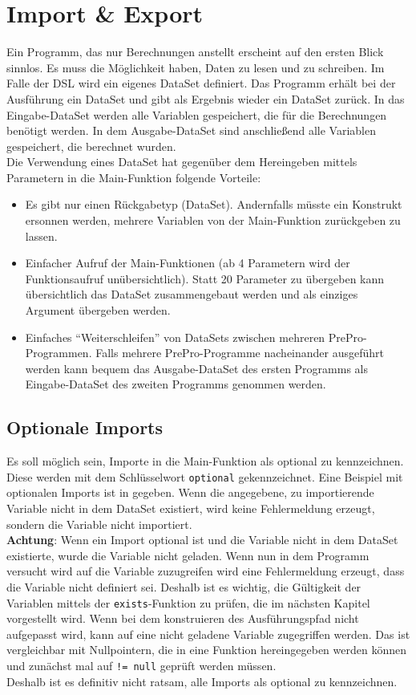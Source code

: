 \section{Import \& Export}
\label{sec:Import}

Ein Programm, das nur Berechnungen anstellt erscheint auf den ersten Blick sinnlos.
Es muss die Möglichkeit haben, Daten zu lesen und zu schreiben.
Im Falle der DSL wird ein eigenes DataSet definiert.
Das Programm erhält bei der Ausführung ein DataSet und gibt als Ergebnis wieder ein DataSet zurück.
In das Eingabe-DataSet werden alle Variablen gespeichert, die für die Berechnungen benötigt werden.
In dem Ausgabe-DataSet sind anschließend alle Variablen gespeichert, die berechnet wurden.\\
Die Verwendung eines DataSet hat gegenüber dem Hereingeben mittels Parametern in die Main-Funktion folgende Vorteile:
\begin{itemize}
\item Es gibt nur einen Rückgabetyp (DataSet).
Andernfalls müsste ein Konstrukt ersonnen werden, mehrere Variablen von der Main-Funktion zurückgeben zu lassen.
\item Einfacher Aufruf der Main-Funktionen (ab 4 Parametern wird der Funktionsaufruf unübersichtlich\cite{parameterCount}). Statt 20 Parameter zu übergeben kann übersichtlich das DataSet zusammengebaut werden und als einziges Argument übergeben werden.
\item Einfaches ``Weiterschleifen'' von DataSets zwischen mehreren PrePro-Programmen.
Falls mehrere PrePro-Programme nacheinander ausgeführt werden kann bequem das Ausgabe-DataSet des ersten Programms als Eingabe-DataSet des zweiten Programms genommen werden.
\end{itemize}

\subsection{Optionale Imports}
Es soll möglich sein, Importe in die Main-Funktion als optional zu kennzeichnen.
Diese werden mit dem Schlüsselwort \texttt{optional} gekennzeichnet.
Eine Beispiel mit optionalen Imports ist in  gegeben.
Wenn die angegebene, zu importierende Variable nicht in dem DataSet existiert, wird keine Fehlermeldung erzeugt, sondern die Variable nicht importiert.\\
\textbf{Achtung}: Wenn ein Import optional ist und die Variable nicht in dem DataSet existierte, wurde die Variable nicht geladen.
Wenn nun in dem Programm versucht wird auf die Variable zuzugreifen wird eine Fehlermeldung erzeugt, dass die Variable nicht definiert sei.
Deshalb ist es wichtig, die Gültigkeit der Variablen mittels der \texttt{exists}-Funktion zu prüfen, die im nächsten Kapitel vorgestellt wird.
Wenn bei dem konstruieren des Ausführungspfad nicht aufgepasst wird, kann auf eine nicht geladene Variable zugegriffen werden.
Das ist vergleichbar mit Nullpointern, die in eine Funktion hereingegeben werden können und zunächst mal auf \texttt{!= null} geprüft werden müssen.\\
Deshalb ist es definitiv nicht ratsam, alle Imports als optional zu kennzeichnen.

